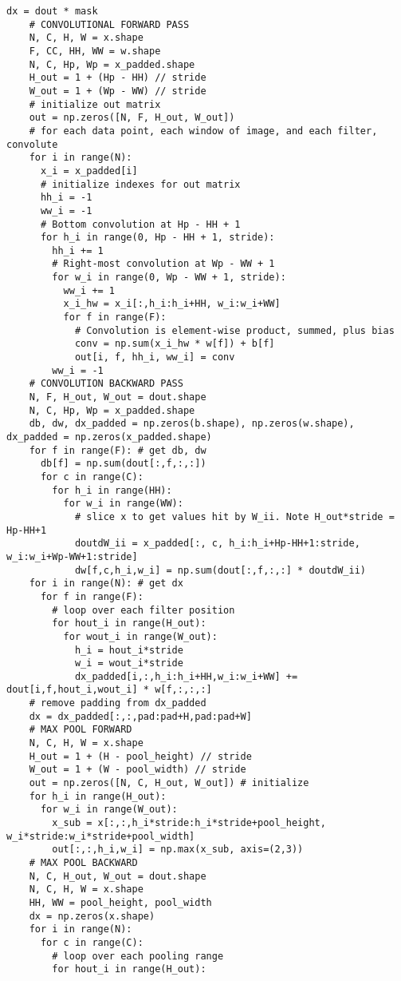 \documentclass[9pt]{extarticle}
\begin{document}
\begin{lstlisting}[multicols=2]
    dx = dout * mask
    # CONVOLUTIONAL FORWARD PASS
    N, C, H, W = x.shape
    F, CC, HH, WW = w.shape
    N, C, Hp, Wp = x_padded.shape
    H_out = 1 + (Hp - HH) // stride
    W_out = 1 + (Wp - WW) // stride
    # initialize out matrix
    out = np.zeros([N, F, H_out, W_out])
    # for each data point, each window of image, and each filter, convolute
    for i in range(N):
      x_i = x_padded[i]
      # initialize indexes for out matrix
      hh_i = -1
      ww_i = -1
      # Bottom convolution at Hp - HH + 1
      for h_i in range(0, Hp - HH + 1, stride):
        hh_i += 1
        # Right-most convolution at Wp - WW + 1
        for w_i in range(0, Wp - WW + 1, stride):
          ww_i += 1
          x_i_hw = x_i[:,h_i:h_i+HH, w_i:w_i+WW]
          for f in range(F):
            # Convolution is element-wise product, summed, plus bias
            conv = np.sum(x_i_hw * w[f]) + b[f]
            out[i, f, hh_i, ww_i] = conv
        ww_i = -1
    # CONVOLUTION BACKWARD PASS
    N, F, H_out, W_out = dout.shape
    N, C, Hp, Wp = x_padded.shape
    db, dw, dx_padded = np.zeros(b.shape), np.zeros(w.shape), dx_padded = np.zeros(x_padded.shape)
    for f in range(F): # get db, dw
      db[f] = np.sum(dout[:,f,:,:])
      for c in range(C):
        for h_i in range(HH):
          for w_i in range(WW):
            # slice x to get values hit by W_ii. Note H_out*stride = Hp-HH+1
            doutdW_ii = x_padded[:, c, h_i:h_i+Hp-HH+1:stride, w_i:w_i+Wp-WW+1:stride]
            dw[f,c,h_i,w_i] = np.sum(dout[:,f,:,:] * doutdW_ii)
    for i in range(N): # get dx
      for f in range(F):
        # loop over each filter position
        for hout_i in range(H_out):
          for wout_i in range(W_out):
            h_i = hout_i*stride
            w_i = wout_i*stride
            dx_padded[i,:,h_i:h_i+HH,w_i:w_i+WW] += dout[i,f,hout_i,wout_i] * w[f,:,:,:]
    # remove padding from dx_padded
    dx = dx_padded[:,:,pad:pad+H,pad:pad+W]
    # MAX POOL FORWARD
    N, C, H, W = x.shape
    H_out = 1 + (H - pool_height) // stride
    W_out = 1 + (W - pool_width) // stride 
    out = np.zeros([N, C, H_out, W_out]) # initialize
    for h_i in range(H_out):
      for w_i in range(W_out):
        x_sub = x[:,:,h_i*stride:h_i*stride+pool_height, w_i*stride:w_i*stride+pool_width]
        out[:,:,h_i,w_i] = np.max(x_sub, axis=(2,3))
    # MAX POOL BACKWARD
    N, C, H_out, W_out = dout.shape
    N, C, H, W = x.shape
    HH, WW = pool_height, pool_width
    dx = np.zeros(x.shape)
    for i in range(N):
      for c in range(C):
        # loop over each pooling range
        for hout_i in range(H_out):

\end{lstlisting}
\end{document}
